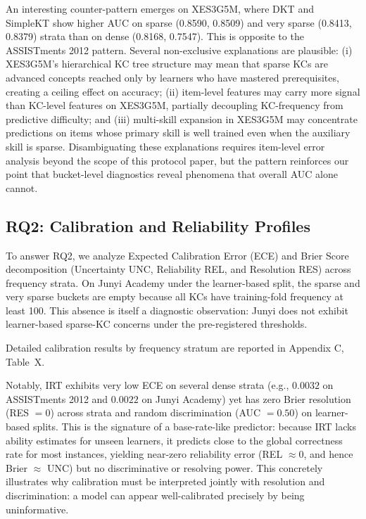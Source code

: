 An interesting counter-pattern emerges on XES3G5M, where DKT and SimpleKT show higher AUC on sparse (0.8590, 0.8509) and very sparse (0.8413, 0.8379) strata than on dense (0.8168, 0.7547). This is opposite to the ASSISTments 2012 pattern. Several non-exclusive explanations are plausible: (i) XES3G5M's hierarchical KC tree structure may mean that sparse KCs are advanced concepts reached only by learners who have mastered prerequisites, creating a ceiling effect on accuracy; (ii) item-level features may carry more signal than KC-level features on XES3G5M, partially decoupling KC-frequency from predictive difficulty; and (iii) multi-skill expansion in XES3G5M may concentrate predictions on items whose primary skill is well trained even when the auxiliary skill is sparse. Disambiguating these explanations requires item-level error analysis beyond the scope of this protocol paper, but the pattern reinforces our point that bucket-level diagnostics reveal phenomena that overall AUC alone cannot.

\subsection{RQ2: Calibration and Reliability Profiles}
To answer RQ2, we analyze Expected Calibration Error (ECE) and Brier Score decomposition (Uncertainty UNC, Reliability REL, and Resolution RES) across frequency strata. On Junyi Academy under the learner-based split, the sparse and very sparse buckets are empty because all KCs have training-fold frequency at least 100. This absence is itself a diagnostic observation: Junyi does not exhibit learner-based sparse-KC concerns under the pre-registered thresholds.

Detailed calibration results by frequency stratum are reported in Appendix C, Table~X.

Notably, IRT exhibits very low ECE on several dense strata (e.g., $0.0032$ on ASSISTments 2012 and $0.0022$ on Junyi Academy) yet has zero Brier resolution (RES $= 0$) across strata and random discrimination (AUC $= 0.50$) on learner-based splits. This is the signature of a base-rate-like predictor: because IRT lacks ability estimates for unseen learners, it predicts close to the global correctness rate for most instances, yielding near-zero reliability error (REL $\approx 0$, and hence Brier $\approx$ UNC) but no discriminative or resolving power. This concretely illustrates why calibration must be interpreted jointly with resolution and discrimination: a model can appear well-calibrated precisely by being uninformative.

